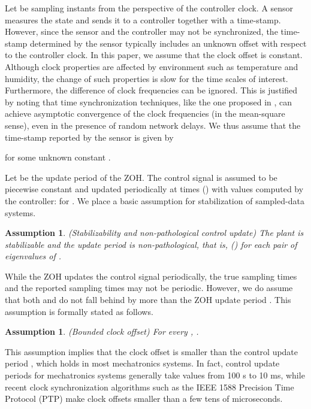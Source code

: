 \documentclass[letterpaper, 12pt, draftcls, onecolumn]{ieeeconf}
\newtheorem{assumption}[theorem]{Assumption}
\begin{document}
Let  be sampling instants
from the perspective of the controller clock.
A sensor measures the state  and sends it to a controller
together with a time-stamp.
However, since the sensor and the controller may not be synchronized,
the time-stamp determined by the sensor 
typically includes an 
unknown offset with respect to the controller clock. 
In this paper, we assume that the clock offset is constant. 
Although
clock properties are affected by environment such as temperature
and humidity,
the change of such properties is slow 
for the time scales of interest.
Furthermore, the difference of 
clock frequencies can be ignored. 
This is justified by noting that 
time synchronization techniques, like the one proposed 
in \cite{He2014},
can achieve asymptotic convergence of the clock frequencies (in the mean-square sense),
even in the presence of random network delays.
We thus assume that
the time-stamp  reported by the sensor is given by

for some unknown constant .

Let  be the update period of the ZOH.
The control signal  
is assumed to be piecewise constant and updated periodically at times  () with values  computed by the controller:
 for .
We place a basic assumption for stabilization of sampled-data systems.
\begin{assumption}
	\label{ass:stabilizability}
	{\em(}Stabilizability and non-pathological control update{\em)}
	{\em
The plant  is stabilizable and the update period  is non-pathological,
		that is,  ()
		for each pair  of eigenvalues of .
	}
\end{assumption}


While the ZOH updates the control signal  periodically, 
the true sampling times  and the reported sampling times 
 may not be periodic. 
However, we do assume that both  and  do not fall 
behind  by more than the ZOH update period .
This assumption is formally stated as follows.
\begin{assumption}
	\label{ass:sample}
	{\em(}Bounded clock offset{\em)}
	{\em
For every ,
. 
	}
\end{assumption}
This assumption implies that
the clock offset  is smaller than the control update period ,
which holds 
in most mechatronics systems. In fact,
control update periods 
for mechatronics systems
generally take values from 100 s to 10 ms,
while
recent clock
synchronization algorithms such as the IEEE 1588 Precision Time Protocol (PTP)
\cite{PTP}
make clock offsets smaller than a few tens of microseconds.
\end{document}
